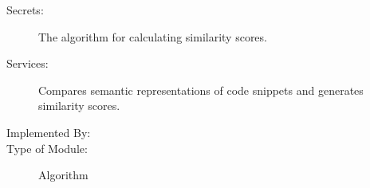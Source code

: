\documentclass[12pt, titlepage]{article}
\newcommand{\mref}[1]{M\ref{#1}}
\begin{document}
\begin{description}
\item[Secrets:] The algorithm for calculating similarity scores.
\item[Services:] Compares semantic representations of code snippets and generates similarity scores.
\item[Implemented By:] \progname{}
\item[Type of Module:] Algorithm
\end{description}






\end{document}
